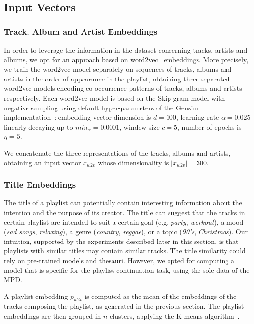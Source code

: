 \subsection{Input Vectors}

\subsubsection{Track, Album and Artist Embeddings}
\label{rnn:sec:track_embs}

In order to leverage the information in the dataset concerning tracks, artists and albums, we opt for an approach based on word2vec~\cite{Mikolov2013} embeddings. More precisely, we train the word2vec model separately on sequences of tracks, albums and artists in the order of appearance in the playlist, obtaining three separated word2vec models encoding co-occurrence patterns of tracks, albums and artists respectively. Each word2vec model is based on the Skip-gram model with negative sampling using default hyper-parameters of the Gensim implementation~\cite{Rehurek2010}: embedding vector dimension is $d=100$, learning rate $\alpha = 0.025$ linearly decaying up to $min_{\alpha} = 0.0001$, window size $c = 5$, number of epochs is $\eta = 5$.

We concatenate the three representations of the tracks, albums and artists, obtaining an input vector $x_{w2v}$ whose dimensionality is $|x_{w2v}| = 300$.

\subsubsection{Title Embeddings}
\label{rnn:sec:title_embs}

The title of a playlist can potentially contain interesting information about the intention and the purpose of its creator. The title can suggest that the tracks in certain playlist are intended to suit a certain goal (e.g. \textit{party}, \textit{workout}), a mood (\textit{sad songs}, \textit{relaxing}), a genre (\textit{country}, \textit{reggae}), or a topic (\textit{90's}, \textit{Christmas}). Our intuition, supported by the experiments described later in this section, is that playlists with similar titles may contain similar tracks.
The title similarity could rely on pre-trained models and thesauri. However, we opted for computing a model that is specific for the playlist continuation task, using the sole data of the MPD.

A playlist embedding $p_{w2v}$ is computed as the mean of the embeddings of the tracks composing the playlist, as generated in the previous section. The playlist embeddings are then grouped in $n$ clusters, applying the K-means algorithm~\cite{Hartigan1979}.

